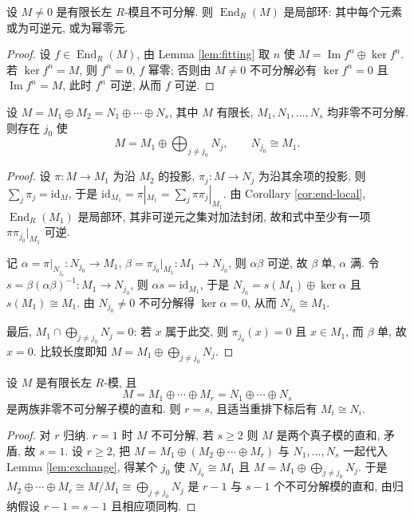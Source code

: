 \begin{corollary}\label{cor:end-local}
设 $M\ne0$ 是有限长左 $R$-模且不可分解. 则 $\operatorname{End}_R(M)$ 是局部环:
其中每个元素或为可逆元, 或为幂零元.
\end{corollary}

\begin{proof}
设 $f\in\operatorname{End}_R(M)$, 由 Lemma \ref{lem:fitting} 取 $n$ 使
$M=\operatorname{Im}f^n\oplus\ker f^n$. 若 $\ker f^n=M$, 则 $f^n=0$, $f$ 幂零;
否则由 $M\ne0$ 不可分解必有 $\ker f^n=0$ 且 $\operatorname{Im}f^n=M$, 此时 $f^n$ 可逆,
从而 $f$ 可逆.
\end{proof}

\begin{lemma}[交换引理]\label{lem:exchange}
设 $M=M_1\oplus M_2=N_1\oplus\cdots\oplus N_s$, 其中 $M$ 有限长, $M_1,N_1,\dots,N_s$ 均非零不可分解. 则存在 $j_0$ 使
\[
  M=M_1\oplus\bigoplus_{j\ne j_0}N_j,\qquad N_{j_0}\cong M_1 .
\]
\end{lemma}

\begin{proof}
设 $\pi\colon M\to M_1$ 为沿 $M_2$ 的投影, $\pi_j\colon M\to N_j$ 为沿其余项的投影,
则 $\sum_j\pi_j=\mathrm{id}_M$, 于是
$\mathrm{id}_{M_1}=\pi|_{M_1}=\sum_j\pi\pi_j|_{M_1}$.
由 Corollary \ref{cor:end-local}, $\operatorname{End}_R(M_1)$ 是局部环, 其非可逆元之集对加法封闭,
故和式中至少有一项 $\pi\pi_{j_0}|_{M_1}$ 可逆.

记 $\alpha=\pi|_{N_{j_0}}\colon N_{j_0}\to M_1$, $\beta=\pi_{j_0}|_{M_1}\colon M_1\to N_{j_0}$,
则 $\alpha\beta$ 可逆, 故 $\beta$ 单, $\alpha$ 满. 令
$s=\beta(\alpha\beta)^{-1}\colon M_1\to N_{j_0}$, 则 $\alpha s=\mathrm{id}_{M_1}$, 于是
$N_{j_0}=s(M_1)\oplus\ker\alpha$ 且 $s(M_1)\cong M_1$. 由 $N_{j_0}\ne0$ 不可分解得
$\ker\alpha=0$, 从而 $N_{j_0}\cong M_1$.

最后, $M_1\cap\bigoplus_{j\ne j_0}N_j=0$: 若 $x$ 属于此交, 则 $\pi_{j_0}(x)=0$ 且 $x\in M_1$,
而 $\beta$ 单, 故 $x=0$. 比较长度即知 $M=M_1\oplus\bigoplus_{j\ne j_0}N_j$.
\end{proof}

\begin{theorem}\label{thm:krull-schmidt}
设 $M$ 是有限长左 $R$-模, 且
\[
  M=M_1\oplus\cdots\oplus M_r=N_1\oplus\cdots\oplus N_s
\]
是两族非零不可分解子模的直和. 则 $r=s$, 且适当重排下标后有 $M_i\cong N_i$.
\end{theorem}

\begin{proof}
对 $r$ 归纳. $r=1$ 时 $M$ 不可分解, 若 $s\ge2$ 则 $M$ 是两个真子模的直和, 矛盾, 故 $s=1$.
设 $r\ge2$, 把 $M=M_1\oplus(M_2\oplus\cdots\oplus M_r)$ 与 $N_1,\dots,N_s$ 一起代入
Lemma \ref{lem:exchange}, 得某个 $j_0$ 使 $N_{j_0}\cong M_1$ 且
$M=M_1\oplus\bigoplus_{j\ne j_0}N_j$. 于是
$M_2\oplus\cdots\oplus M_r\cong M/M_1\cong\bigoplus_{j\ne j_0}N_j$ 是 $r-1$ 与 $s-1$
个不可分解模的直和, 由归纳假设 $r-1=s-1$ 且相应项同构.
\end{proof}


